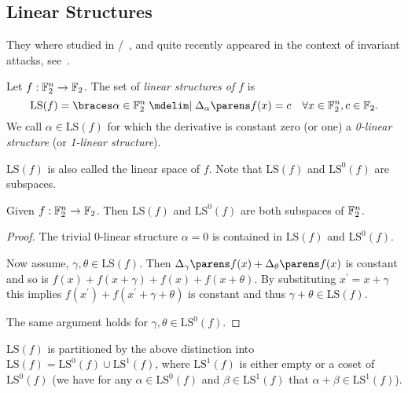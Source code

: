 \subsection{Linear Structures}
They where studied in \eg/~, and quite recently appeared in the context of invariant attacks, see~\cite{C:BCLR17}.
\begin{definition}
    Let $f : \mathbb{F}_2^n \to \mathbb{F}_2$.
    The set of \emph{linear structures of $f$} is
    \begin{equation*}
        \mathrm{LS}(f) = \set{\alpha \in \F_2^n \given \derive{\alpha}{f}(x) = c \quad \forall x \in \F_2^n, c \in \F_2}.
    \end{equation*}
    We call $\alpha \in \mathrm{LS}(f)$ for which the derivative is constant zero (or one) a \emph{0-linear structure} (or \emph{1-linear structure}).
\end{definition}
$\mathrm{LS}(f)$ is also called the linear space of $f$.
Note that $\mathrm{LS}(f)$ and $\mathrm{LS}^0(f)$ are subspaces.
\begin{lemma}
    Given $f : \mathbb{F}_2^n \to \mathbb{F}_2$.
    Then $\mathrm{LS}(f)$ and $\mathrm{LS}^0(f)$ are both subspaces of $\mathbb{F}_2^n$.
\end{lemma}
\begin{proof}
    The trivial 0-linear structure $\alpha = 0$ is contained in $\mathrm{LS}(f)$ and $\mathrm{LS}^0(f)$.

    Now assume, $\gamma, \theta \in \mathrm{LS}(f)$.
    Then $\derive{\gamma}{f}(x) + \derive{\theta}{f}(x)$ is constant and so is $f(x) + f(x + \gamma) + f(x) + f(x + \theta)$.
    By substituting $x^\prime = x + \gamma$ this implies $f(x^\prime) + f(x^\prime + \gamma + \theta)$ is constant and thus $\gamma + \theta \in \mathrm{LS}(f)$.

    The same argument holds for $\gamma, \theta \in \mathrm{LS}^0(f)$.
\end{proof}
$\mathrm{LS}(f)$ is partitioned by the above distinction into $\mathrm{LS}(f) = \mathrm{LS}^0(f) \cup \mathrm{LS}^1(f)$, where $\mathrm{LS}^1(f)$ is either empty or a coset of $\mathrm{LS}^0(f)$ (we have for any $\alpha \in \mathrm{LS}^0(f)$ and $\beta \in \mathrm{LS}^1(f)$ that $\alpha + \beta \in \mathrm{LS}^1(f)$).


